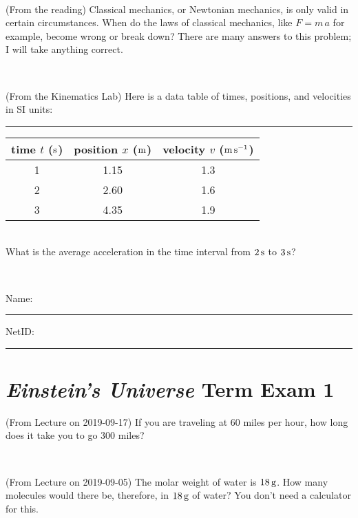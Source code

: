 \documentclass[12pt, letterpaper]{article}
\begin{document}
\vfill ~

\begin{problem} (From the reading)
Classical mechanics, or Newtonian mechanics, is only valid in certain
circumstances. When do the laws of classical mechanics, like $F =
m\,a$ for example, become wrong or break down? There are many answers
to this problem; I will take anything correct.
\end{problem}


\vfill ~

\begin{problem} (From the Kinematics Lab)
Here is a data table of times, positions, and velocities in SI units:\\
\rule{1.0in}{0pt}\begin{tabular}{c|c|c}
time $t$ ($\mathrm{s}$) & position $x$ ($\mathrm{m}$) & velocity $v$ ($\mathrm{m}\,\mathrm{s}^{-1}$) \\
\hline
1 & 1.15 & 1.3 \\
2 & 2.60 & 1.6 \\
3 & 4.35 & 1.9 \\
\hline
\end{tabular}\\
What is the average acceleration in the time interval from $2\,\mathrm{s}$ to $3\,\mathrm{s}$?
\end{problem}


\vfill ~


\cleardoublepage



\noindent
Name: \rule[-1ex]{0.60\textwidth}{0.1pt}
NetID: \rule[-1ex]{0.20\textwidth}{0.1pt}

\section*{\textsl{Einstein's Universe} Term Exam 1}
\setcounter{problem}{1}


\begin{problem} (From Lecture on 2019-09-17)
If you are traveling at 60 miles per hour, how long does
it take you to go 300 miles?
\end{problem}


\vfill ~

\begin{problem} (From Lecture on 2019-09-05)
The molar weight of water is $18\,\mathrm{g}$. How many molecules would there
be, therefore, in $18\,\mathrm{g}$ of water? You don't need a calculator for
this.
\end{problem}


\vfill ~
\end{document}
